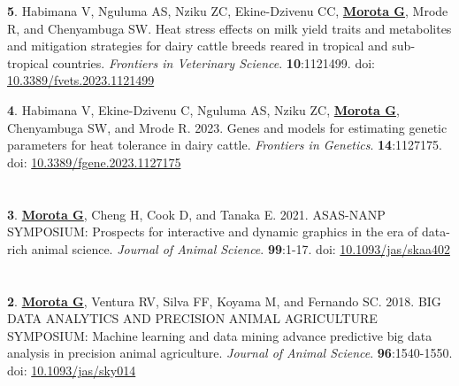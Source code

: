 \documentclass[margin,line,10pt]{res}
\newenvironment{list1}{
  \begin{list}{\ding{113}}{%
      \setlength{\itemsep}{0in}
      \setlength{\parsep}{0in} \setlength{\parskip}{0in}
      \setlength{\topsep}{0in} \setlength{\partopsep}{0in} 
      \setlength{\leftmargin}{0.17in}}}{\end{list}}
\begin{document}
\begin{resume}
\begin{list1}
  \item  [{\bf 5}.] Habimana V, Nguluma AS, Nziku ZC, Ekine-Dzivenu CC, \textbf{\underline{Morota G}}, Mrode R, and Chenyambuga SW. Heat stress effects on milk yield traits and metabolites and mitigation strategies for dairy cattle breeds reared in tropical and sub-tropical countries. \emph{Frontiers in Veterinary Science}. \textbf{10}:1121499. doi: \textcolor{blue}{\href{https://doi.org/10.3389/fvets.2023.1121499}{10.3389/fvets.2023.1121499}} 


  \vspace{0.5cm}

  \item  [{\bf 4}.] Habimana V, Ekine-Dzivenu C, Nguluma AS, Nziku ZC, \textbf{\underline{Morota G}}, Chenyambuga SW, and Mrode R. 2023. Genes and models for estimating genetic parameters for heat tolerance in dairy cattle. \emph{Frontiers in Genetics}. \textbf{14}:1127175. doi: \textcolor{blue}{\href{https://doi.org/10.3389/fgene.2023.1127175}{10.3389/fgene.2023.1127175}} 

\end{list1}


\section{}
\begin{list1}

 \item  [{\bf 3}.] \textbf{\underline{Morota G}}, Cheng H, Cook D, and Tanaka E. 2021. ASAS-NANP SYMPOSIUM: Prospects for interactive and dynamic graphics in the era of data-rich animal science. \emph{Journal of Animal Science}.  \textbf{99}:1-17. doi: \textcolor{blue}{\href{https://doi.org/10.1093/jas/skaa402}{10.1093/jas/skaa402}} 
   
\end{list1}


\section{}
\begin{list1}

 \item  [{\bf 2}.] \textbf{\underline{Morota G}}, Ventura RV, Silva FF, Koyama M, and Fernando SC. 2018. BIG DATA ANALYTICS AND PRECISION ANIMAL AGRICULTURE SYMPOSIUM: Machine learning and data mining advance predictive big data analysis in precision animal agriculture. \emph{Journal of Animal Science}. \textbf{96}:1540-1550. doi: \textcolor{blue}{\href{http://dx.doi.org/10.1093/jas/sky014}{10.1093/jas/sky014}}
   

\end{list1}
\end{resume}
\end{document}
